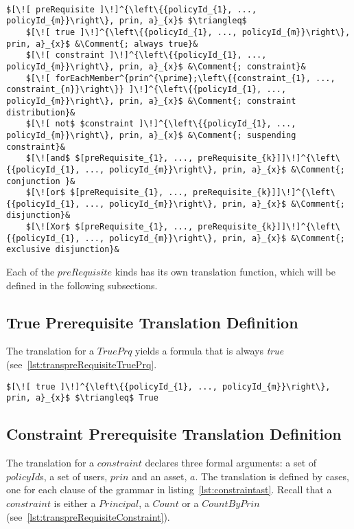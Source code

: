 \lstset{mathescape, language=AST}  
\begin{lstlisting}[frame=single, caption={Prerequisite Translation Definition},label={lst:transprerequisitedefinitionAST}]

$[\![ preRequisite ]\!]^{\left\{{policyId_{1}, ..., policyId_{m}}\right\}, prin, a}_{x}$ $\triangleq$
    $[\![ true ]\!]^{\left\{{policyId_{1}, ..., policyId_{m}}\right\}, prin, a}_{x}$ &\Comment{; always true}&
    $[\![ constraint ]\!]^{\left\{{policyId_{1}, ..., policyId_{m}}\right\}, prin, a}_{x}$ &\Comment{; constraint}&      
    $[\![ forEachMember^{prin^{\prime};\left\{{constraint_{1}, ..., constraint_{n}}\right\}} ]\!]^{\left\{{policyId_{1}, ..., policyId_{m}}\right\}, prin, a}_{x}$ &\Comment{; constraint distribution}&
    $[\![ not$ $constraint ]\!]^{\left\{{policyId_{1}, ..., policyId_{m}}\right\}, prin, a}_{x}$ &\Comment{; suspending constraint}&
    $[\![and$ $[preRequisite_{1}, ..., preRequisite_{k}]]\!]^{\left\{{policyId_{1}, ..., policyId_{m}}\right\}, prin, a}_{x}$ &\Comment{; conjunction }&
    $[\![or$ $[preRequisite_{1}, ..., preRequisite_{k}]]\!]^{\left\{{policyId_{1}, ..., policyId_{m}}\right\}, prin, a}_{x}$ &\Comment{; disjunction}&
    $[\![Xor$ $[preRequisite_{1}, ..., preRequisite_{k}]]\!]^{\left\{{policyId_{1}, ..., policyId_{m}}\right\}, prin, a}_{x}$ &\Comment{; exclusive disjunction}&

\end{lstlisting}

Each of the $preRequisite$ kinds has its own translation function, which will be defined in the following subsections.

\subsection{True Prerequisite Translation Definition}
The translation for a $TruePrq$ yields a formula that is always \emph{true} (see~\ref{lst:transpreRequisiteTruePrq}.

\lstset{mathescape, language=AST}  
\begin{lstlisting}[frame=single, caption={Prerequisite Translation Definition {$\colon$} Always True Prerequisite},label={lst:transpreRequisiteTruePrq}]
	$[\![ true ]\!]^{\left\{{policyId_{1}, ..., policyId_{m}}\right\}, prin, a}_{x}$ $\triangleq$ True
\end{lstlisting}

\subsection{Constraint Prerequisite Translation Definition}
The translation for a $constraint$ declares three formal arguments: a set of $policyId$s, a set of users, $prin$ and an asset, $a$. The translation is defined by cases, one for each clause of the grammar in listing~\ref{lst:constraintast}. Recall that a $constraint$ is either a $Principal$, a $Count$ or a $CountByPrin$ (see~\ref{lst:transpreRequisiteConstraint}).


